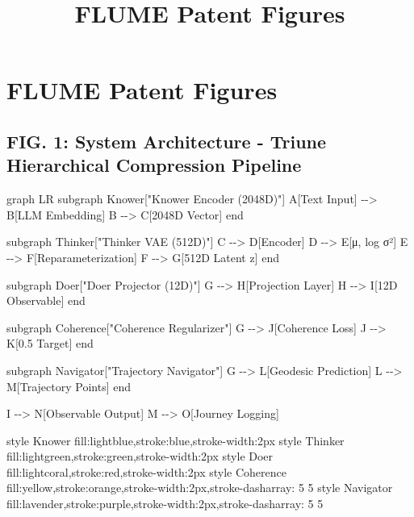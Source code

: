 \documentclass[
  letterpaper,
  DIV=11,
  numbers=noendperiod]{scrartcl}
\title{FLUME Patent Figures}
\author{}
\date{}
\newenvironment{Shaded}{\begin{snugshade}}{\end{snugshade}}
\newcommand{\NormalTok}[1]{\textcolor[rgb]{0.00,0.23,0.31}{#1}}
\begin{document}
\maketitle


\section{FLUME Patent Figures}\label{flume-patent-figures}

\subsection{FIG. 1: System Architecture - Triune Hierarchical
Compression
Pipeline}\label{fig.-1-system-architecture---triune-hierarchical-compression-pipeline}

\begin{Shaded}
\begin{Highlighting}[]
\NormalTok{graph LR}
\NormalTok{    subgraph Knower["Knower Encoder (2048D)"]}
\NormalTok{        A[Text Input] {-}{-}\textgreater{} B[LLM Embedding]}
\NormalTok{        B {-}{-}\textgreater{} C[2048D Vector]}
\NormalTok{    end}
    
\NormalTok{    subgraph Thinker["Thinker VAE (512D)"]}
\NormalTok{        C {-}{-}\textgreater{} D[Encoder]}
\NormalTok{        D {-}{-}\textgreater{} E[μ, log σ²]}
\NormalTok{        E {-}{-}\textgreater{} F[Reparameterization]}
\NormalTok{        F {-}{-}\textgreater{} G[512D Latent z]}
\NormalTok{    end}
    
\NormalTok{    subgraph Doer["Doer Projector (12D)"]}
\NormalTok{        G {-}{-}\textgreater{} H[Projection Layer]}
\NormalTok{        H {-}{-}\textgreater{} I[12D Observable]}
\NormalTok{    end}
    
\NormalTok{    subgraph Coherence["Coherence Regularizer"]}
\NormalTok{        G {-}{-}\textgreater{} J[Coherence Loss]}
\NormalTok{        J {-}{-}\textgreater{} K[0.5 Target]}
\NormalTok{    end}
    
\NormalTok{    subgraph Navigator["Trajectory Navigator"]}
\NormalTok{        G {-}{-}\textgreater{} L[Geodesic Prediction]}
\NormalTok{        L {-}{-}\textgreater{} M[Trajectory Points]}
\NormalTok{    end}
    
\NormalTok{    I {-}{-}\textgreater{} N[Observable Output]}
\NormalTok{    M {-}{-}\textgreater{} O[Journey Logging]}
    
\NormalTok{    style Knower fill:lightblue,stroke:blue,stroke{-}width:2px}
\NormalTok{    style Thinker fill:lightgreen,stroke:green,stroke{-}width:2px}
\NormalTok{    style Doer fill:lightcoral,stroke:red,stroke{-}width:2px}
\NormalTok{    style Coherence fill:yellow,stroke:orange,stroke{-}width:2px,stroke{-}dasharray: 5 5}
\NormalTok{    style Navigator fill:lavender,stroke:purple,stroke{-}width:2px,stroke{-}dasharray: 5 5}
\end{Highlighting}
\end{Shaded}
\end{document}
